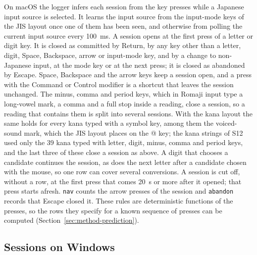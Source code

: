 On macOS the logger infers each session from the key presses while a Japanese input source is selected. It learns
the input source from the input-mode keys of the JIS layout once one of them has been seen, and otherwise from polling
the current input source every 100~ms. A session opens at the first press of a letter or digit key. It is closed as
committed by Return, by any key other than a letter, digit, Space, Backspace, arrow or input-mode key, and by a change
to non-Japanese input, at the mode key or at the next press; it is closed as abandoned by Escape. Space, Backspace and the arrow keys keep a session open,
and a press with the Command or Control modifier is a shortcut that leaves the session unchanged. The minus, comma
and period keys, which in Romaji input type a long-vowel mark, a comma and a full stop inside a reading, close a
session, so a reading that contains them is split into several sessions. With the kana layout the same holds for every
kana typed with a symbol key, among them the voiced-sound mark, which the JIS layout places on the @ key; the kana
strings of S12 used only the 39 kana typed with letter, digit, minus, comma and period keys, and the last three of these
close a session as above. A digit that chooses a candidate continues
the session, as does the next letter after a candidate chosen with the mouse, so one row can cover several
conversions. A session is cut off, without a row, at the first press that comes 20~s or more after it opened; that
press starts afresh. \texttt{nav} counts the arrow presses of the session and \texttt{abandon} records that Escape
closed it. These rules are deterministic functions of the presses, so the rows they specify for a known sequence of
presses can be computed (Section~\ref{sec:method-prediction}).

\subsection{Sessions on Windows}
\label{sec:logger-windows}

